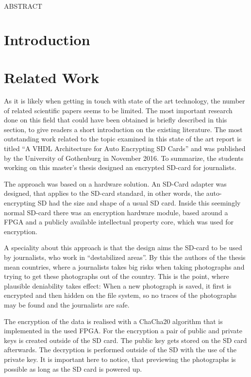 \documentclass[12pt,a4paper,titlepage,oneside]{scrartcl}
\begin{document}
\maketitle
\setcounter{section}{0}
\setcounter{tocdepth}{2}
\tableofcontents

ABSTRACT

\section{Introduction}
\section{Related Work}
As it is likely when getting in touch with state of the art technology, the number of related scientific papers seems to be limited.
The most important research done on this field that could have been obtained is briefly described in this section, to give readers a short introduction on the existing literature. 
The most outstanding work related to the topic examined in this state of the art report is titled ``A VHDL Architecture for Auto Encrypting SD Cards'' and was published by the University of Gothenburg in November 2016.
To summarize, the students working on this master's thesis designed an encrypted SD-card for journalists.

The approach was based on a hardware solution.
An SD-Card adapter was designed, that applies to the SD-card standard, in other words, the auto-encrypting SD had the size and shape of a usual SD card.
Inside this seemingly normal SD-card there was an encryption hardware module, based around a FPGA and a publicly available intellectual property core, which was used for encryption.

A speciality about this approach is that the design aims the SD-card to be used by journalists, who work in ``destabilized areas''.
By this the authors of the thesis mean countries, where a journalists takes big risks when taking photographs and trying to get these photographs out of the country.
This is the point, where plausible deniability takes effect: When a new photograph is saved, it first is encrypted and then hidden on the file system, so no traces of the photographs may be found and the journalists are safe.

The encryption of the data is realised with a ChaCha20 algorithm that is implemented in the used FPGA.
For the encryption a pair of public and private keys is created outside of the SD card.
The public key gets stored on the SD card afterwards.
The decryption is performed outside of the SD with the use of the private key.
It is important here to notice, that previewing the photographs is possible as long as the SD card is powered up. 
\end{document}
